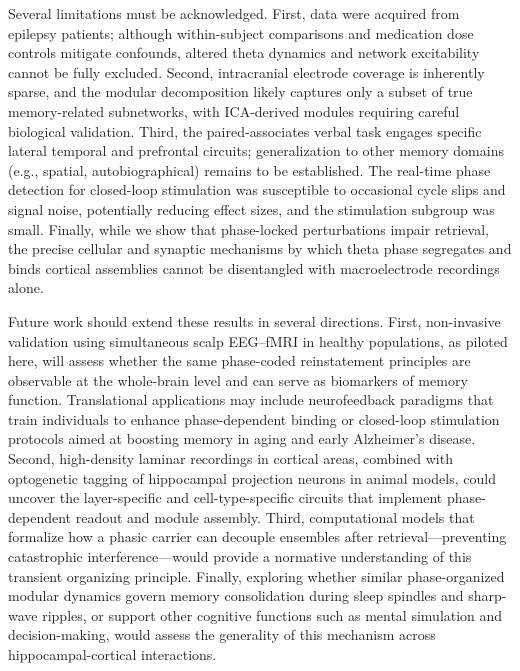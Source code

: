 \documentclass{article}
\begin{document}
Several limitations must be acknowledged. First, data were acquired from epilepsy patients; although within-subject comparisons and medication dose controls mitigate confounds, altered theta dynamics and network excitability cannot be fully excluded. Second, intracranial electrode coverage is inherently sparse, and the modular decomposition likely captures only a subset of true memory-related subnetworks, with ICA-derived modules requiring careful biological validation. Third, the paired-associates verbal task engages specific lateral temporal and prefrontal circuits; generalization to other memory domains (e.g., spatial, autobiographical) remains to be established. The real-time phase detection for closed-loop stimulation was susceptible to occasional cycle slips and signal noise, potentially reducing effect sizes, and the stimulation subgroup was small. Finally, while we show that phase-locked perturbations impair retrieval, the precise cellular and synaptic mechanisms by which theta phase segregates and binds cortical assemblies cannot be disentangled with macroelectrode recordings alone.

Future work should extend these results in several directions. First, non-invasive validation using simultaneous scalp EEG–fMRI in healthy populations, as piloted here, will assess whether the same phase-coded reinstatement principles are observable at the whole-brain level and can serve as biomarkers of memory function. Translational applications may include neurofeedback paradigms that train individuals to enhance phase-dependent binding or closed-loop stimulation protocols aimed at boosting memory in aging and early Alzheimer’s disease. Second, high-density laminar recordings in cortical areas, combined with optogenetic tagging of hippocampal projection neurons in animal models, could uncover the layer-specific and cell-type-specific circuits that implement phase-dependent readout and module assembly. Third, computational models that formalize how a phasic carrier can decouple ensembles after retrieval—preventing catastrophic interference—would provide a normative understanding of this transient organizing principle. Finally, exploring whether similar phase-organized modular dynamics govern memory consolidation during sleep spindles and sharp-wave ripples, or support other cognitive functions such as mental simulation and decision-making, would assess the generality of this mechanism across hippocampal-cortical interactions.



\end{document}
